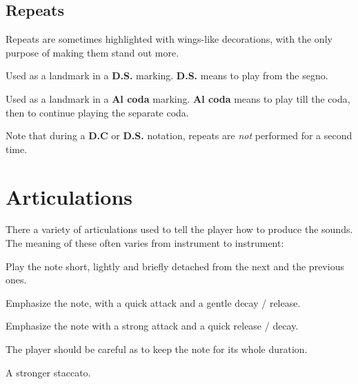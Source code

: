 \subsection{Repeats}
Repeats are sometimes highlighted with wings-like decorations, with the only purpose of making them stand out more.

\begin{definition}[Segno]
    Used as a landmark in a \textbf{D.S.} marking. \textbf{D.S.} means to play from the segno.
\end{definition}

\begin{definition}[Coda]
    Used as a landmark in a \textbf{Al coda} marking. \textbf{Al coda} means to play till the coda, then to continue playing the separate coda.
\end{definition}

Note that during a \textbf{D.C} or \textbf{D.S.} notation, repeats are \emph{not} performed for a second time.

\section{Articulations}
There a variety of articulations used to tell the player how to produce the sounds. The meaning of these often varies from instrument to instrument:

\begin{definition}[Staccato]
    Play the note short, lightly and briefly detached from the next and the previous ones.
\end{definition}

\begin{definition}[Accent]
    Emphasize the note, with a quick attack and a gentle decay / release.
\end{definition}

\begin{definition}[Marcato]
    Emphasize the note with a strong attack and a quick release / decay.
\end{definition}

\begin{definition}[Tenuto]
    The player should be careful as to keep the note for its whole duration.
\end{definition}

\begin{definition}[Staccatissimo]
    A stronger staccato.
\end{definition}

